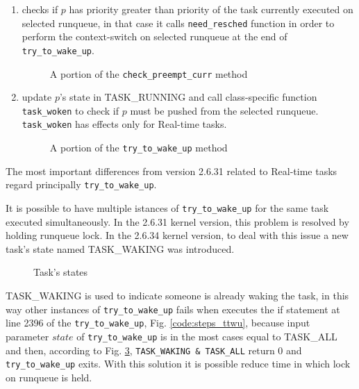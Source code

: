 \begin{enumerate}
\item checks if $p$ has priority greater than priority of the task currently
executed on selected runqueue, in that case it calls \texttt{need\_resched}
function in order to perform the context-switch on selected runqueue at the
end of \texttt{try\_to\_wake\_up}.

\begin{figure}[h]
  \lstset{basicstyle=\footnotesize, language=c, captionpos=b, frame=single,label=lis:steps}
  
  \label{code:prio_ttwu}
  \caption{A portion of the \texttt{check\_preempt\_curr} method}
\end{figure}

\item update $p$'s state in TASK\_RUNNING and call class-specific function 
\texttt{task\_woken} to check if $p$ must be pushed from the selected runqueue.
\texttt{task\_woken} has effects only for Real-time tasks.

\begin{figure}[h]
  \lstset{basicstyle=\footnotesize, language=c, captionpos=b, frame=single,label=lis:steps}
  
  \label{code:final_ttwu}
  \caption{A portion of the \texttt{try\_to\_wake\_up} method}
\end{figure}

\end{enumerate}

The most important differences from version 2.6.31 related to Real-time tasks regard principally \texttt{try\_to\_wake\_up}.

It is possible to have multiple istances of \texttt{try\_to\_wake\_up} for the same task executed simultaneously. In the 2.6.31 kernel version, this problem
is resolved by holding runqueue lock. In the 2.6.34 kernel version, to deal with this issue a new task's state named TASK\_WAKING was introduced. 

\begin{figure}[h]
  \lstset{basicstyle=\footnotesize, language=c, captionpos=b, frame=single,label=lis:steps}
  
  \label{code:task_states}
  \caption{Task's states}
\end{figure}

TASK\_WAKING is used to indicate someone is already waking the task, in this way other instances of \texttt{try\_to\_wake\_up} fails when executes the if 
statement at line 2396 of the \texttt{try\_to\_wake\_up}, Fig. \ref{code:steps_ttwu}, because input parameter $state$ of \texttt{try\_to\_wake\_up} is in 
the most cases equal to TASK\_ALL and then, according to Fig. \ref{code:task_states}, \texttt{TASK\_WAKING \& TASK\_ALL} return 0 and 
\texttt{try\_to\_wake\_up} exits. With this solution it is possible reduce time in which lock on runqueue is held. 

